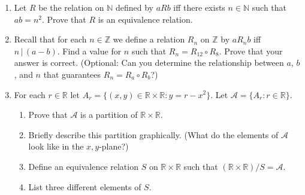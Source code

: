 \documentclass{article}
\newcommand{\bR}{\mathbb{R}}
\newcommand{\bZ}{\mathbb{Z}}
\newcommand{\bN}{\mathbb{N}}
\begin{document}
{\begin{enumerate}[labelindent=0pt,leftmargin=0pt]
    One simple relation on $\mathbb{R}$ that is symmetric and transitive, but not reflexive, is the "not-equal-to" relation. We define this relation $R$ as follows: for all $x, y \in \mathbb{R}$, $(x, y) \in R$ if and only if $x \neq y$.

    Let's justify that this relation satisfies the properties:
    
    Symmetric: If $x \neq y$, then $y \neq x$. Hence, if $(x, y) \in R$, then $(y, x) \in R$. So, $R$ is symmetric.
    Transitive: If $x \neq y$ and $y \neq z$, then $x \neq z$. Hence, if $(x, y) \in R$ and $(y, z) \in R$, then $(x, z) \in R$. So, $R$ is transitive.
    Not reflexive: For any $x \in \mathbb{R}$, we have $x = x$, so $(x, x) \notin R$. Hence, $R$ is not reflexive.
    Thus, the "not-equal-to" relation on $\mathbb{R}$ satisfies the required properties.

    \item Let $R$ be the relation on $\bN$ defined by $a R b$ iff there exists $n\in\bN$ such that $ab=n^2$. Prove that $R$ is an equivalence relation.

    \item Recall that for each $n\in\bZ$ we define a relation $R_n$ on $\bZ$ by $a R_n b$ iff $n\,|\,(a-b)$. Find a value for $n$ such that $R_n=R_{12}\circ R_8$. Prove that your answer is correct. (Optional: Can you determine the relationship between $a$, $b$, and $n$ that guarantees $R_n=R_a\circ R_b$?)

    \item For each $r\in\bR$ let $A_r=\{(x,y)\in\bR\times\bR:y=r-x^2\}$. Let $\mathcal{A}=\{A_r:r\in\bR\}$.\begin{enumerate}
    \item Prove that $\mathcal{A}$ is a partition of $\bR\times\bR$.
    \item Briefly describe this partition graphically. (What do the elements of $\mathcal{A}$ look like in the $x,y$-plane?)
    \item Define an equivalence relation $S$ on $\bR\times\bR$ such that $(\bR\times\bR)/S=\mathcal{A}$.
    \item List three different elements of $S$.
    \end{enumerate}

    
    \end{enumerate}

}
\end{document}

